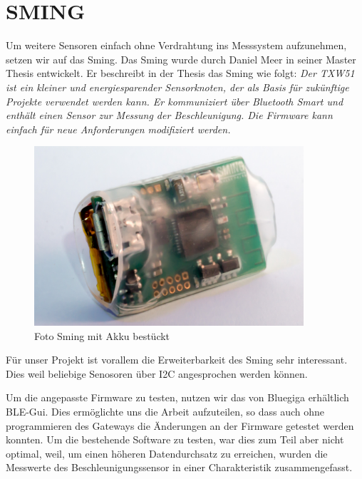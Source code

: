 \chapter{SMING}\label{sec:sming}
Um weitere Sensoren einfach ohne Verdrahtung ins Messsystem aufzunehmen, setzen wir auf das Sming. Das Sming wurde durch Daniel Meer in seiner Master Thesis entwickelt. Er beschreibt in der Thesis das Sming wie folgt: \textit{Der TXW51 ist ein kleiner und energiesparender Sensorknoten, der als Basis für zukünftige Projekte verwendet werden kann. Er kommuniziert über Bluetooth Smart und enthält einen Sensor zur Messung der Beschleunigung. Die Firmware kann einfach für neue Anforderungen modifiziert werden.}\cite{meer:masterthesis}

\begin{figure}[hbtp]
	\center
	\includegraphics[width=10cm]{bilder/foto-6.jpg}
	\caption{Foto Sming mit Akku bestückt}
	\label{fig:sming}
\end{figure}

Für unser Projekt ist vorallem die Erweiterbarkeit des Sming sehr interessant. Dies weil beliebige Senosoren über I2C angesprochen werden können.

Um die angepasste Firmware zu testen, nutzen wir das von Bluegiga erhältlich BLE-Gui. Dies ermöglichte uns die Arbeit aufzuteilen, so dass auch ohne programmieren des Gateways die Änderungen an der Firmware getestet werden konnten. Um die bestehende Software zu testen, war dies zum Teil aber nicht optimal, weil, um einen höheren Datendurchsatz zu erreichen, wurden die Messwerte des Beschleunigungssensor in einer Charakteristik zusammengefasst.


